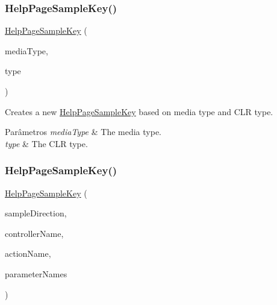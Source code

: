 \subsubsection{\texorpdfstring{Help\+Page\+Sample\+Key()}{HelpPageSampleKey()}\hspace{0.1cm}{\footnotesize\ttfamily [2/4]}}
{\footnotesize\ttfamily \hyperlink{classApi3Layers_1_1Areas_1_1HelpPage_1_1HelpPageSampleKey}{Help\+Page\+Sample\+Key} (\begin{DoxyParamCaption}\item[{Media\+Type\+Header\+Value}]{media\+Type,  }\item[{Type}]{type }\end{DoxyParamCaption})}



Creates a new \hyperlink{classApi3Layers_1_1Areas_1_1HelpPage_1_1HelpPageSampleKey}{Help\+Page\+Sample\+Key} based on media type and C\+LR type. 


\begin{DoxyParams}{Parâmetros}
{\em media\+Type} & The media type.\\
\hline
{\em type} & The C\+LR type.\\
\hline
\end{DoxyParams}
\mbox{\label{classApi3Layers_1_1Areas_1_1HelpPage_1_1HelpPageSampleKey_a9d13ae49a586ec810778b5a497bfbf53}} 
\subsubsection{\texorpdfstring{Help\+Page\+Sample\+Key()}{HelpPageSampleKey()}\hspace{0.1cm}{\footnotesize\ttfamily [3/4]}}
{\footnotesize\ttfamily \hyperlink{classApi3Layers_1_1Areas_1_1HelpPage_1_1HelpPageSampleKey}{Help\+Page\+Sample\+Key} (\begin{DoxyParamCaption}\item[{\hyperlink{namespaceApi3Layers_1_1Areas_1_1HelpPage_abad9f6d2b059d72558bf70415efc32b5}{Sample\+Direction}}]{sample\+Direction,  }\item[{string}]{controller\+Name,  }\item[{string}]{action\+Name,  }\item[{I\+Enumerable$<$ string $>$}]{parameter\+Names }\end{DoxyParamCaption})}



